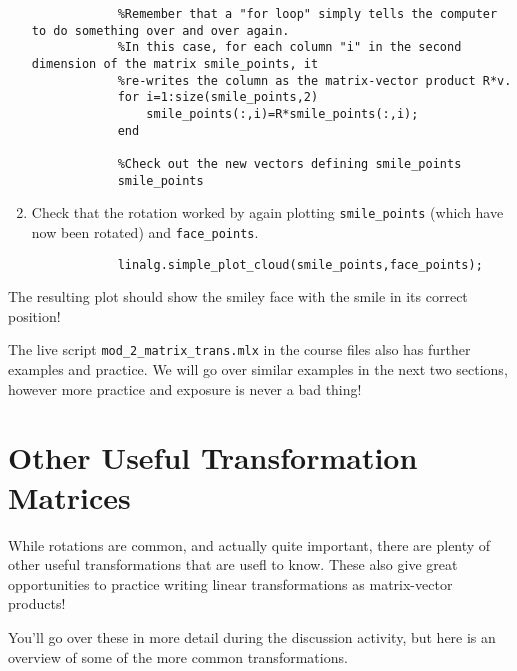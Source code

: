 \documentclass{ximera}
\begin{document}
\begin{example}
\begin{enumerate}
\begin{verbatim}
            %Remember that a "for loop" simply tells the computer to do something over and over again.
            %In this case, for each column "i" in the second dimension of the matrix smile_points, it
            %re-writes the column as the matrix-vector product R*v.
            for i=1:size(smile_points,2)
                smile_points(:,i)=R*smile_points(:,i);
            end
            
            %Check out the new vectors defining smile_points
            smile_points
            \end{verbatim}

            \item Check that the rotation worked by again plotting \texttt{smile\_points} (which have now been rotated) and \texttt{face\_points}.
            
            \begin{verbatim}
            linalg.simple_plot_cloud(smile_points,face_points);
            \end{verbatim}

        \end{enumerate}

        The resulting plot should show the smiley face with the smile in its correct position!

    \end{example}

    \begin{remark}
      The live script \texttt{mod\_2\_matrix\_trans.mlx} in the course files also has further examples and practice. We will go over similar examples in the next two sections, however more practice and exposure is never a bad thing!
    \end{remark}

\section*{Other Useful Transformation Matrices}

    While rotations are common, and actually quite important, there are plenty of other useful transformations that are usefl to know. These also give great opportunities to practice writing linear transformations as matrix-vector products!

    You'll go over these in more detail during the discussion activity, but here is an overview of some of the more common transformations.
\end{document}
